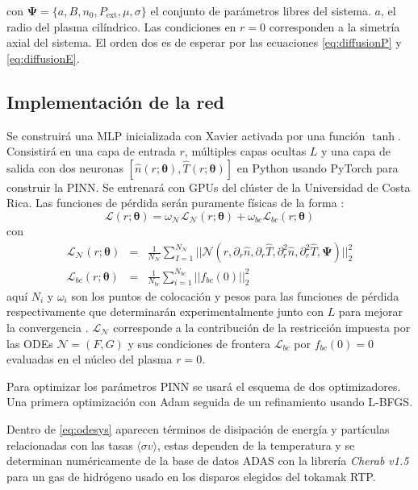 con $\bm{\Psi} = \{a, B, n_0, P_\text{ext}, \mu, \sigma\}$ el conjunto de parámetros libres del sistema. $a$, el radio del plasma cilíndrico. Las condiciones en $r = 0$ corresponden a la simetría axial del sistema. El orden dos es de esperar por las ecuaciones \eqref{eq:diffusionP} y \eqref{eq:diffusionE}.
\subsection{Implementación de la red}
Se construirá una MLP inicializada con Xavier activada por una función $\tanh$. Consistirá en una capa de entrada $r$, múltiples capas ocultas $L$ y una capa de salida con dos neuronas $[\hat{n}(r; \bm{\theta}), \hat{T}(r; \bm{\theta})]$ en Python usando PyTorch \cite{pytorch} para construir la PINN. Se entrenará con GPUs del clúster de la Universidad de Costa Rica. Las funciones de pérdida serán puramente físicas de la forma \cite{raissi2019}:
\begin{equation}
	\mathcal{L}(r; \bm{\theta}) = \omega_\mathcal{N} \mathcal{L}_\mathcal{N} (r; \bm{\theta})+ \omega_{bc} \mathcal{L}_{bc}(r; \bm{\theta})
\end{equation}
con
{\small
\begin{eqnarray}
	\mathcal{L}_\mathcal{N} (r; \bm{\theta}) &=&\frac{1}{N_\mathcal{N}}\sum\limits_{I=1}^{N_\mathcal{N}} || \mathcal{N}(r, \partial_r \hat{n}, \partial_r \hat{T}, \partial_r^2 \hat{n}, \partial_r^2\hat{T}, \bm{\Psi}) ||_2^2\\
	\mathcal{L}_{bc}(r; \bm{\theta}) &=& \frac{1}{N_{bc}}\sum\limits_{i=1}^{N_{bc}} || f_{bc}(0)||_2^2
\end{eqnarray}}
aquí $N_i$ y $\omega_i$ son los puntos de colocación y pesos  para las funciones de pérdida respectivamente que determinarán experimentalmente junto con $L$ para mejorar la convergencia . $\mathcal{L}_\mathcal{N}$ corresponde a la contribución de la restricción impuesta por las ODEs  $\mathcal{N} = (F,G)$ y sus condiciones de frontera $\mathcal{L}_{bc}$ por $f_{bc}(0) = 0$ evaluadas en el núcleo del plasma $r = 0$.

Para optimizar los parámetros PINN se usará el esquema de dos optimizadores. Una primera optimización con Adam seguida de un refinamiento usando L-BFGS.

Dentro de \eqref{eq:odesys} aparecen términos de disipación de energía y partículas relacionadas con las tasas $\langle \sigma v \rangle$, estas dependen de la temperatura y se determinan numéricamente de la base de datos ADAS con la librería \textit{Cherab v1.5} \cite{cherab} para un gas de hidrógeno usado en los disparos elegidos del tokamak RTP.
\vspace{- 5 mm}
